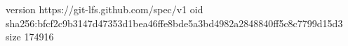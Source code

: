 version https://git-lfs.github.com/spec/v1
oid sha256:bfcf2c9b3147d47353d1bea46ffe8bde5a3bd4982a2848840ff5c8c7799d15d3
size 174916
